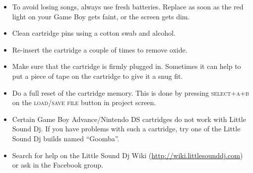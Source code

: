 \begin{itemize}
	\item To avoid losing songs, always use fresh batteries. Replace as soon as the red light on your Game Boy gets faint, or the screen gets dim.
	\item Clean cartridge pins using a cotton swab and alcohol.
	\item Re-insert the cartridge a couple of times to remove oxide.
	\item Make sure that the cartridge is firmly plugged in. Sometimes it can help to put a piece of tape on the cartridge to give it a snug fit.
	\item Do a full reset of the cartridge memory. This is done by pressing \textsc{select+a+b} on the \textsc{load/save file} button in project screen.
	\item Certain Game Boy Advance/Nintendo DS cartridges do not work with Little Sound Dj. If you have problems with such a cartridge, try one of the Little Sound Dj builds named ``Goomba''.
	\item Search for help on the Little Sound Dj Wiki (\url{http://wiki.littlesounddj.com}) or ask in the Facebook group.
\end{itemize}
